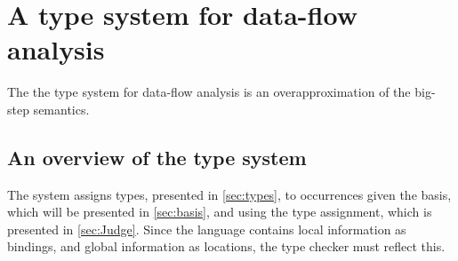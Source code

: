 \documentclass[acmsmall,sigplan]{acmart}
\begin{document}
\iffalse
\begin{example}[Data-flow for abstractions]\label{ex:DFAbs}
The following program creates a local binding to the identity function and applies it twice.

\begin{lstlisting}[language=Caml, mathescape=true]
(let x ($\lambda$ y.(y$^1$))$^2$ (let z (x$^3$ 1$^4$)$^5$ (x$^6$ 2$^7$)$^{8}$)$^{9}$)$^{10}$
\end{lstlisting}
The transition tree can be found in \cref{FigEx.Abs}.
In the transition tree, we see that $\psi$ is extended a couple of times, where we will take a look at a couple of interesting extensions to $\psi$
The first time we evaluate the abstraction body, $\psi$ is on the following form:

$$\psi_2=(w_2=[x^{2}\mapsto(\emptyset,\emptyset), y^{4}\mapsto(\emptyset,\emptyset)],\sqsubseteq_w^2=\emptyset)$$
Here, the lookup of the parameter $y$ is simple, as there are only one occurrence, where we then know that $inf_{\psi_2}(y)=4$.

The second time we evaluate the body of the abstraction, $\psi$ is on the following form:

$$\psi_3=(w_3=[x^{2}\mapsto(\emptyset,\emptyset), y^{4}\mapsto(\emptyset,\emptyset), y^{7}\mapsto(\emptyset,\emptyset)],\sqsubseteq_w^2=\{4,7\})$$
Here, we now have two bindings for the parameter $y$, but since we also know that there are an ordering for the two occurrences of $y$, we then know that the program point $7$ is evaluated after $4$, as such we know that $inf_{\psi_3}(y)=7$.
\end{example}

\begin{landscape}

\end{landscape}
\fi

\section{A type system for data-flow analysis}\label{sec:TypeSys}

The the type system for data-flow analysis is an overapproximation of
the big-step semantics.

\subsection{An overview of the type system}

The system assigns types, presented in \cref{sec:types}, to occurrences given the basis, which will be presented in \cref{sec:basis}, and using the type assignment, which is presented in \cref{sec:Judge}.
Since the language contains local information as bindings, and global
information as locations, the type checker must reflect this.
\end{document}
